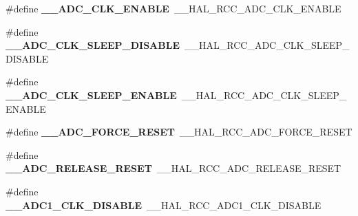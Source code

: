\begin{DoxyCompactItemize}
\item 
\hypertarget{group___h_a_l___r_c_c___aliased_ga3c9e07dfc357910bdd8241d83e1ab404}{\#define {\bfseries \-\_\-\-\_\-\-A\-D\-C\-\_\-\-C\-L\-K\-\_\-\-E\-N\-A\-B\-L\-E}~\-\_\-\-\_\-\-H\-A\-L\-\_\-\-R\-C\-C\-\_\-\-A\-D\-C\-\_\-\-C\-L\-K\-\_\-\-E\-N\-A\-B\-L\-E}\label{group___h_a_l___r_c_c___aliased_ga3c9e07dfc357910bdd8241d83e1ab404}

\item 
\hypertarget{group___h_a_l___r_c_c___aliased_gaea979d2b065299f4699d49fbf7dc1162}{\#define {\bfseries \-\_\-\-\_\-\-A\-D\-C\-\_\-\-C\-L\-K\-\_\-\-S\-L\-E\-E\-P\-\_\-\-D\-I\-S\-A\-B\-L\-E}~\-\_\-\-\_\-\-H\-A\-L\-\_\-\-R\-C\-C\-\_\-\-A\-D\-C\-\_\-\-C\-L\-K\-\_\-\-S\-L\-E\-E\-P\-\_\-\-D\-I\-S\-A\-B\-L\-E}\label{group___h_a_l___r_c_c___aliased_gaea979d2b065299f4699d49fbf7dc1162}

\item 
\hypertarget{group___h_a_l___r_c_c___aliased_gac919ab7c7218c3d5be119a7a66727cf8}{\#define {\bfseries \-\_\-\-\_\-\-A\-D\-C\-\_\-\-C\-L\-K\-\_\-\-S\-L\-E\-E\-P\-\_\-\-E\-N\-A\-B\-L\-E}~\-\_\-\-\_\-\-H\-A\-L\-\_\-\-R\-C\-C\-\_\-\-A\-D\-C\-\_\-\-C\-L\-K\-\_\-\-S\-L\-E\-E\-P\-\_\-\-E\-N\-A\-B\-L\-E}\label{group___h_a_l___r_c_c___aliased_gac919ab7c7218c3d5be119a7a66727cf8}

\item 
\hypertarget{group___h_a_l___r_c_c___aliased_gac2ca60c797339b8fb2407e1cd19268b7}{\#define {\bfseries \-\_\-\-\_\-\-A\-D\-C\-\_\-\-F\-O\-R\-C\-E\-\_\-\-R\-E\-S\-E\-T}~\-\_\-\-\_\-\-H\-A\-L\-\_\-\-R\-C\-C\-\_\-\-A\-D\-C\-\_\-\-F\-O\-R\-C\-E\-\_\-\-R\-E\-S\-E\-T}\label{group___h_a_l___r_c_c___aliased_gac2ca60c797339b8fb2407e1cd19268b7}

\item 
\hypertarget{group___h_a_l___r_c_c___aliased_ga2d1f1b26b6536e9c64d5aadc3477166b}{\#define {\bfseries \-\_\-\-\_\-\-A\-D\-C\-\_\-\-R\-E\-L\-E\-A\-S\-E\-\_\-\-R\-E\-S\-E\-T}~\-\_\-\-\_\-\-H\-A\-L\-\_\-\-R\-C\-C\-\_\-\-A\-D\-C\-\_\-\-R\-E\-L\-E\-A\-S\-E\-\_\-\-R\-E\-S\-E\-T}\label{group___h_a_l___r_c_c___aliased_ga2d1f1b26b6536e9c64d5aadc3477166b}

\item 
\hypertarget{group___h_a_l___r_c_c___aliased_ga6506d98e0a44a0fd83fc893acdea24b6}{\#define {\bfseries \-\_\-\-\_\-\-A\-D\-C1\-\_\-\-C\-L\-K\-\_\-\-D\-I\-S\-A\-B\-L\-E}~\-\_\-\-\_\-\-H\-A\-L\-\_\-\-R\-C\-C\-\_\-\-A\-D\-C1\-\_\-\-C\-L\-K\-\_\-\-D\-I\-S\-A\-B\-L\-E}\label{group___h_a_l___r_c_c___aliased_ga6506d98e0a44a0fd83fc893acdea24b6}


\end{DoxyCompactItemize}
